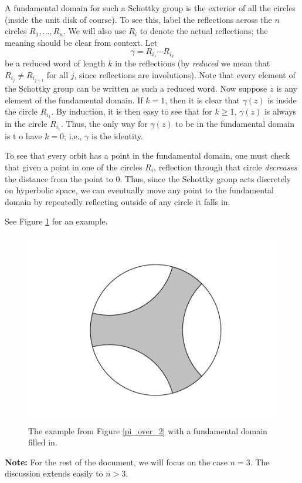 \documentclass[]{article}
\begin{document}
A fundamental domain for such a Schottky group is the exterior of all the circles (inside the unit disk of course).
To see this, label the reflections across the $n$ circles $R_1, \dots, R_n$.
We will also use $R_i$ to denote the actual reflections; the meaning should be clear from context.
Let
$$
\gamma = R_{i_1}\cdots R_{i_k}
$$
be a reduced word of length $k$ in the reflections (by \textit{reduced} we mean that $R_{i_j} \neq R_{i_{j+1}}$ for all $j$, since reflections are involutions).
Note that every element of the Schottky group can be written as such a reduced word.
Now suppose $z$ is any element of the fundamental domain.
If $k = 1$, then it is clear that $\gamma(z)$ is inside the circle $R_{i_1}$.
By induction, it is then easy to see that for $k \geq 1$, $\gamma(z)$ is always in the circle $R_{i_1}$.
Thus, the only way for $\gamma(z)$ to be in the fundamental domain is t o have $k = 0$; i.e., $\gamma$ is the identity.

To see that every orbit has a point in the fundamental domain, one must check that given a point in one of the circles $R_i$, reflection through that circle \textit{decreases} the distance from the point to $0$.
Thus, since the Schottky group acts discretely on hyperbolic space, we can eventually move any point to the fundamental domain by repeatedly reflecting outside of any circle it falls in.

See Figure \ref{disk_FD} for an example.

\begin{figure}[h]
	\centering
	\includegraphics[trim=110 40 100 50, clip, width=0.6\linewidth]{disk_FD.pdf}
	\caption{The example from Figure \ref{pi_over_2} with a fundamental domain filled in.}
	\label{disk_FD}
\end{figure}

\textbf{Note:} For the rest of the document, we will focus on the case $n = 3$.
The discussion extends easily to $n > 3$.
\end{document}
